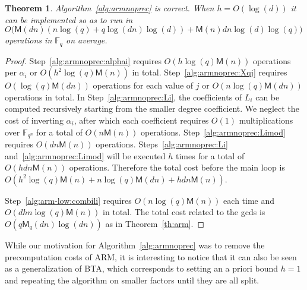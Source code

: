 \documentclass{article}
\newcommand{\ff}[1]{\mathbb{F}_{#1}}
\newcommand{\fqn}{\ff{q^n}}
\newcommand{\qq}{q}
\newcommand{\basef}{\ff{\qq}}
\newcommand{\bigO}{O}
\newcommand{\Mul}{\mathsf{M}}
\newcounter{algo}
\newtheorem{Theo}{Theorem}
\begin{document}
\begin{Theo}
  \label{th:armnoprec}
  Algorithm~\ref{alg:armnoprec} is correct. When $h=O(\log(d))$ it can be implemented so as to
  run in 
  $O\bigl(\Mul(dn)(n\log(q) + q\log(dn)\log(d))  + \Mul(n)dn\log(d)\log(q)  \bigr)$ 
  operations in $\basef$ on
  average.
\end{Theo}
\begin{proof}
Step~\ref{alg:armnoprec:alphai} requires $\bigO(h\log(q) \Mul(n))$ operations per $\alpha_i$ or $\bigO(h^2\log(q) \Mul(n))$ in total.
Step~\ref{alg:armnoprec:Xqj} requires $\bigO(\log(q)\Mul(dn))$ operations for each value of $j$ or $\bigO(n\log(q)\Mul(dn))$ operations in total.
In Step~\ref{alg:armnoprec:Li}, the coefficients of $L_i$ can be computed recursively starting from the smaller degree coefficient. We neglect the cost of inverting $\alpha_i$, after which each coefficient requires $\bigO(1)$ multiplications over $\fqn$ for a total of $\bigO(n\Mul(n))$ operations.
Step~\ref{alg:armnoprec:Limod} requires $\bigO(dn\Mul(n))$ operations. Steps~\ref{alg:armnoprec:Li} and~\ref{alg:armnoprec:Limod} will be executed $h$ times for a total of $\bigO(hdn\Mul(n))$ operations.
Therefore the total cost before the main loop is $\bigO(h^2\log(q)\Mul(n)+n\log(q)\Mul(dn)+hdn\Mul(n))$.

 
Step~\ref{alg:arm-low:combili} requires $\bigO(n\log(q)\Mul(n))$ each time and $\bigO(dhn\log(q)\Mul(n))$ in total. The total cost related to the gcds is $O(q\Mul_q(dn)\log(dn))$ as in Theorem~\ref{th:arm}.
\end{proof}



While our motivation for Algorithm~\ref{alg:armnoprec} was to remove the precomputation costs of ARM, it is interesting to notice that it can also be seen as a generalization of BTA, which corresponds to setting an a priori bound $h=1$ and repeating the algorithm on smaller factors until they are all split.
\end{document}

